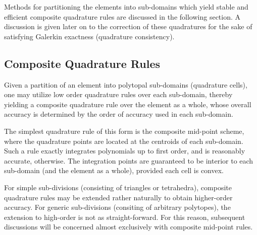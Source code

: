 Methods for partitioning the elements into sub-domains which yield stable and efficient composite quadrature rules are discussed in the following section. A discussion is given later on to the correction of these quadratures for the sake of satisfying Galerkin exactness (quadrature consistency).
		
	\subsection*{Composite Quadrature Rules}
	
	Given a partition of an element into polytopal sub-domains (quadrature cells), one may utilize low order quadrature rules over each sub-domain, thereby yielding a composite quadrature rule over the element as a whole, whose overall accuracy is determined by the order of accuracy used in each sub-domain.
	
	The simplest quadrature rule of this form is the composite mid-point scheme, where the quadrature points are located at the centroids of each sub-domain. Such a rule exactly integrates polynomials up to first order, and is reasonably accurate, otherwise. The integration points are guaranteed to be interior to each sub-domain (and the element as a whole), provided each cell is convex.
	
	For simple sub-divisions (consisting of triangles or tetrahedra), composite quadrature rules may be extended rather naturally to obtain higher-order accuracy. For generic sub-divisions (consiting of arbitrary polytopes), the extension to high-order is not as straight-forward. For this reason, subsequent discussions will be concerned almost exclusively with composite mid-point rules.
	
